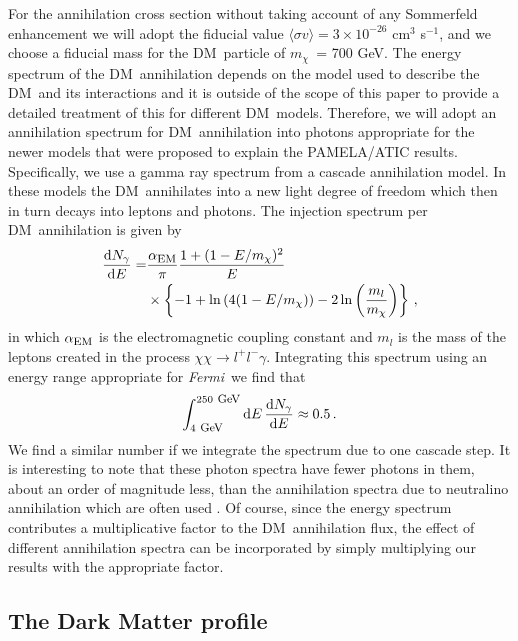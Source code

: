 \documentclass[aps,prd,twocolumn,amsmath,amssymb,floatfix,nofootinbib,10pt]{revtex4}
\newcommand{\Fermi}{\emph{Fermi}}
\newcommand{\DM}{DM}
\newcommand{\mdm}{\ensuremath{m_{\chi}}}
\newcommand{\dd}{\mathrm{d}}
\newcommand{\Ngamma}{\ensuremath{N_{\gamma}}}
\newcommand{\sigmaannv}{\ensuremath{\langle\sigma v\rangle}}
\begin{document}
For the annihilation cross section without taking account of any
Sommerfeld enhancement we will adopt the fiducial value $\sigmaannv =
3 \times 10^{-26} $ cm$^3$ s$^{-1}$, and we choose a fiducial mass for
the \DM\ particle of \mdm\ = 700 GeV. The energy spectrum of the \DM\
annihilation depends on the model used to describe the \DM\ and its
interactions and it is outside of the scope of this paper to provide a
detailed treatment of this for different \DM\ models. Therefore, we
will adopt an annihilation spectrum for \DM\ annihilation into photons
appropriate for the newer models that were proposed to explain the
PAMELA/ATIC results. Specifically, we use a gamma ray spectrum from a
cascade annihilation model. In these models the \DM\ annihilates into
a new light degree of freedom which then in turn decays into leptons
and photons. The injection spectrum per \DM\ annihilation is given by
\cite{2009arXiv0901.2926M}
\begin{equation}\label{eq:annspectrum}
\begin{split}
\frac{\dd \Ngamma}{\dd E} = &\frac{\alpha_{\mbox{{\footnotesize EM}}}}{\pi} \frac{1+(1-E/\mdm)^2}{E}\\
&\times\left\{-1 + \ln\left(4(1-E/\mdm)\right) -2\ln\left(\frac{m_l}{\mdm}\right)\right\}\, ,
\end{split}
\end{equation}
in which $\alpha_{\mbox{{\footnotesize EM}}}$ is the electromagnetic
coupling constant and $m_l$ is the mass of the leptons created in the
process $\chi\chi \rightarrow l^+l^-\gamma$. Integrating this spectrum
using an energy range appropriate for \Fermi\ we find that
\begin{equation} 
\int_{4 \mbox{ {\footnotesize GeV}}}^{250 \mbox{ {\footnotesize GeV}}}\dd E\, \frac{\dd
\Ngamma}{\dd E} \approx 0.5\, .
\end{equation}
We find a similar number if we integrate the spectrum due to one
cascade step. It is interesting to note that these photon spectra have
fewer photons in them, about an order of magnitude less, than the
annihilation spectra due to neutralino annihilation which are often
used \cite{1998APh.....9..137B,2004PhRvD..70j3529F}. Of course, since
the energy spectrum contributes a multiplicative factor to the \DM\
annihilation flux, the effect of different annihilation spectra can be
incorporated by simply multiplying our results with the appropriate
factor.




\subsection{The Dark Matter profile}\label{sec:DMprofile}
\end{document}
